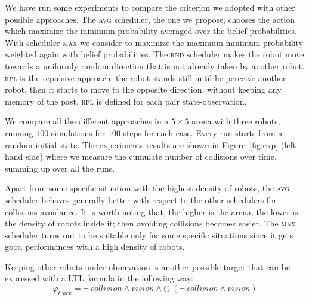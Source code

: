 
We have run some experiments to compare the criterion we adopted with other possible approaches. The \textsc{avg} scheduler, the one we propose, chooses the action which maximize the minimum probability averaged over the belief probabilities. With scheduler \textsc{max} we consider to maximize the maximum minimum probability weighted again with belief probabilities. The \textsc{rnd} scheduler makes the robot move towards a uniformly random direction that is not already taken by another robot. \textsc{rpl} is the repulsive approach: the robot stands still until he perceive another robot, then it starts to move to the opposite direction, without keeping any memory of the past. \textsc{rpl} is defined for each pair state-observation.

We compare all the different approaches in a $5 \times 5$ arena with three robots, running $100$ simulations for $100$ steps for each case. Every run starts from a random initial state. The experiments results are shown in Figure~\ref{fig:exp} (left-hand side) where we measure the cumulate number of collisions over time, summing up over all the runs. 

Apart from some specific situation with the highest density of robots, the \textsc{avg} scheduler 
behaves generally better with respect to the other schedulers for collisions avoidance. It is worth noting that, the higher is the arena, the lower is the density of robots inside it; then avoiding collisions becomes easier. The \textsc{max} scheduler turns out to be suitable only for some specific situations since it gets good performances with a high density of robots.

Keeping other robots under observation is another possible target that can be expressed with a \ac{LTL} formula in the following way:
\vspace{-.2cm}
$$ \varphi_{track} = \neg\ collision \wedge vision \wedge \bigcirc\ (\neg\ collision \wedge vision) $$

